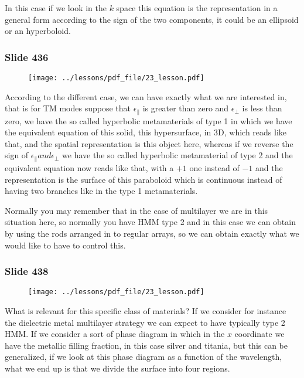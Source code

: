 \documentclass[../main/main.tex]{subfiles}
\begin{document}
In this case if we look in the $k$ space this equation is the representation in a general form according to the sign of the two components, it could be an ellipsoid or an hyperboloid.

\newpage

\subsubsection{Slide 436}

\begin{figure}[h!]
\centering
\texttt{[image: ../lessons/pdf\_file/23\_lesson.pdf]}
\end{figure}

According to the different case, we can have exactly what we are interested in, that is for TM modes suppose that $\epsilon_{\parallel}$ is greater than zero and $\epsilon_{\perp}$ is less than zero, we have the so called hyperbolic metamaterials of type 1 in which we have the equivalent equation of this solid, this hypersurface, in 3D, which reads like that, and the spatial representation is this object here, whereas if we reverse the sign of $\epsilon_{\parallel} and \epsilon_{\perp}$ we have the so called hyperbolic metamaterial of type 2 and the equivalent equation now reads like that, with a $+1$ one instead of $-1$ and the representation is the surface of this paraboloid which is continuous instead of having two branches like in the type 1 metamaterials.

Normally you may remember that in the case of multilayer we are in this situation here, so normally you have HMM type 2 and in this case we can obtain by using the rods arranged in to regular arrays, so we can obtain exactly what we would like to have to control this.

\newpage

\subsubsection{Slide 438}

\begin{figure}[h!]
\centering
\texttt{[image: ../lessons/pdf\_file/23\_lesson.pdf]}
\end{figure}

What is relevant for this specific class of materials? If we consider for instance the dielectric metal multilayer strategy we can expect to have typically type 2 HMM. If we consider a sort of phase diagram in which in the $x$ coordinate we have the metallic filling fraction, in this case silver and titania, but this can be generalized, if we look at this phase diagram as a function of the wavelength, what we end up is that we divide the surface into four regions.
\end{document}
